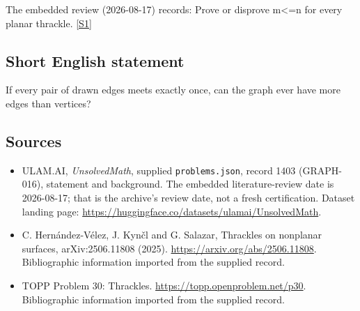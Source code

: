 \documentclass[11pt,a4paper]{article}
\newcommand{\sref}[2]{\hyperlink{source:#1:#2}{[S#2]}}
\begin{document}
The embedded review (2026-08-17) records: Prove or disprove m<=n for every planar thrackle. \sref{1403}{1}

\subsection{Short English statement}

If every pair of drawn edges meets exactly once, can the graph ever have more edges than vertices?

\subsection{Sources}

{\small

\begin{itemize}

\item[\hypertarget{source:1403:1}{S1}] ULAM.AI, \emph{UnsolvedMath}, supplied \texttt{problems.json}, record 1403 (GRAPH-016), statement and background. The embedded literature-review date is 2026-08-17; that is the archive’s review date, not a fresh certification. Dataset landing page: \url{https://huggingface.co/datasets/ulamai/UnsolvedMath}.

\item[\hypertarget{source:1403:2}{S2}] C. Hernández-Vélez, J. Kynčl and G. Salazar, Thrackles on nonplanar surfaces, arXiv:2506.11808 (2025). \url{https://arxiv.org/abs/2506.11808}. Bibliographic information imported from the supplied record.

\item[\hypertarget{source:1403:3}{S3}] TOPP Problem 30: Thrackles. \url{https://topp.openproblem.net/p30}. Bibliographic information imported from the supplied record.

\end{itemize}

}

\label{end:1403}
\end{document}
